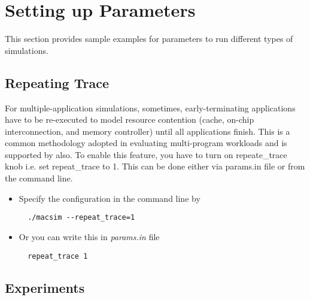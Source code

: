 \section{Setting up Parameters}
\label{sec:parameter}

This section provides sample examples for parameters to run different
types of simulations.


\subsection{Repeating Trace}

For multiple-application simulations, sometimes, early-terminating applications
have to be re-executed to model resource contention (cache, on-chip
    interconnection, and memory controller) until all applications finish. This
is a common methodology adopted in evaluating multi-program workloads and is
supported by \SIM also. To enable this feature, you have to turn on
repeate\_trace knob i.e. set repeat\_trace to 1. This can be done either via
params.in file or from the command line. 

\ignore
{

\begin{itemize}
  \item Specify the configuration in the command line by
  \begin{Verbatim}
  ./macsim --repeat_trace=1
  \end{Verbatim}

  \item Or you can write this in \textit{params.in} file
  \begin{Verbatim}
  repeat_trace 1
  \end{Verbatim}
\end{itemize}
}



\subsection{\cpu Experiments}


